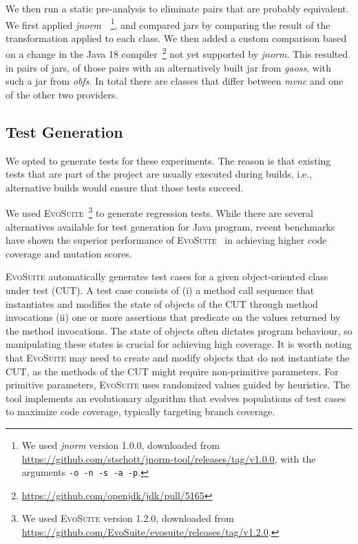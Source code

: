 \documentclass[conference]{IEEEtran}
\makeatletter
\newcommand{\evosuite}{\textsc{EvoSuite}\@\xspace}
\newcommand{\valerio}[1]{\textbf{\textcolor{blue}{[ \ding{46}Valerio: #1]}}}
\newcommand{\inputgen}[1]{\unskip}
\makeatother
\begin{document}
We then run a static pre-analysis to eliminate pairs that are probably equivalent. We first applied \textit{jnorm}~\cite{schott2024JNorm}~\footnote{We used \textit{jnorm} version 1.0.0, downloaded from \url{https://github.com/stschott/jnorm-tool/releases/tag/v1.0.0}, with the arguments \texttt{-o -n -s -a -p}.}, and compared jars by comparing the result of the transformation applied to each class. We then added a custom comparison based on a change in the Java 18 compiler~\footnote{\url{https://github.com/openjdk/jdk/pull/5165}} not yet supported by \textit{jnorm}. This resulted in \inputgen{num-jar-pairs-after-invokevirtual-invokeinterface} pairs of jars, \inputgen{num-jar-pairs-after-invokevirtual-invokeinterface-gaoss} of those pairs with an alternatively built jar from \textit{gaoss}, \inputgen{num-jar-pairs-after-invokevirtual-invokeinterface-obfs} with such a jar from \textit{obfs}.
In total there are \inputgen{num-class-pairs-after-invokevirtual-invokeinterface} classes that differ between \textit{mvnc} and one of the other two providers.



\subsection{Test Generation}

We opted to generate tests for these experiments. The reason is that existing tests that are part of the project are usually executed during builds, i.e., alternative builds would ensure that those tests succeed. 

We used \evosuite~\footnote{We used \evosuite version 1.2.0, downloaded from \url{https://github.com/EvoSuite/evosuite/releases/tag/v1.2.0}.} to generate regression tests. While there are several alternatives available for test generation for Java program, recent benchmarks have shown the superior performance of \evosuite~\cite{jahangirova2023sbft} in achieving higher code coverage and mutation scores. 

\evosuite automatically generates test cases for a given object-oriented class under test (CUT). A test case consists of (i) a method call sequence that instantiates and modifies the state of objects of the CUT through method invocations (ii) one or more assertions that predicate on the values returned by the method invocations. The state of objects often dictates program behaviour, so manipulating these states is crucial for achieving high coverage. It is worth noting that \evosuite may need to create and modify objects that do not instantiate the CUT, as the methods of the CUT might require non-primitive parameters. For primitive parameters, \evosuite uses randomized values guided by heuristics. The tool implements an evolutionary algorithm that evolves populations of test cases to maximize code coverage, typically targeting branch coverage.
\end{document}
